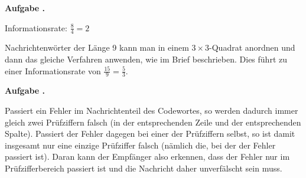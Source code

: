 \documentclass[a4paper,ngerman,12pt]{scrartcl}
\theoremstyle{definition}
\theoremstyle{plain}
\theoremstyle{remark}
\newlength{\aufgabenskip}
\newcounter{aufgabennummer}
\newenvironment{aufgabe}[1]{
	\addtocounter{aufgabennummer}{1}
	\textbf{Aufgabe \theaufgabennummer.} \emph{#1} \par
}{\vspace{\aufgabenskip}}
\begin{document}
\begin{aufgabe}{}
	Informationsrate: $\frac{8}{4}=2$
	
	Nachrichtenwörter der Länge 9 kann man in einem $3\times 3$-Quadrat anordnen und dann das gleiche Verfahren anwenden, wie im Brief beschrieben. Dies führt zu einer Informationsrate von $\frac{15}{9}=\frac{5}{3}$.
\end{aufgabe}

\begin{aufgabe}{}
	Passiert ein Fehler im Nachrichtenteil des Codewortes, so werden dadurch immer gleich zwei Prüfziffern falsch (in der entsprechenden Zeile und der entsprechenden Spalte). Passiert der Fehler dagegen bei einer der Prüfziffern selbst, so ist damit insgesamt nur eine einzige Prüfziffer falsch (nämlich die, bei der der Fehler passiert ist). Daran kann der Empfänger also erkennen, dass der Fehler nur im Prüfzifferbereich passiert ist und die Nachricht daher unverfälscht sein muss.
\end{aufgabe}
\end{document}
